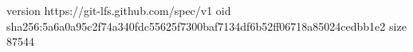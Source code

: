 version https://git-lfs.github.com/spec/v1
oid sha256:5a6a0a95c2f74a340fdc55625f7300baf7134df6b52ff06718a85024cedbb1e2
size 87544
